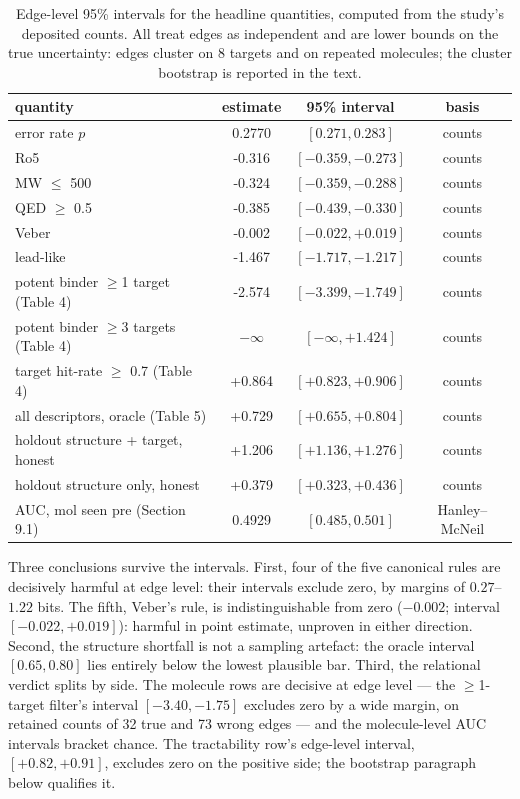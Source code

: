 \documentclass[11pt]{article}
\begin{document}
\begin{table}[t]
\centering
\caption{Edge-level 95\% intervals for the headline quantities, computed
from the study's deposited counts. All treat edges as independent and
are lower bounds on the true uncertainty: edges cluster on 8 targets and
on repeated molecules; the cluster bootstrap is reported in the text.}
\begin{tabular}{lccc}
\toprule
quantity & estimate & 95\% interval & basis \\
\midrule
error rate $p$ & 0.2770 & $[0.271, 0.283]$ & counts \\
Ro5 & -0.316 & $[-0.359, -0.273]$ & counts \\
MW $\leq$ 500 & -0.324 & $[-0.359, -0.288]$ & counts \\
QED $\geq$ 0.5 & -0.385 & $[-0.439, -0.330]$ & counts \\
Veber & -0.002 & $[-0.022, +0.019]$ & counts \\
lead-like & -1.467 & $[-1.717, -1.217]$ & counts \\
potent binder $\geq$1 target (Table 4) & -2.574 & $[-3.399, -1.749]$ & counts \\
potent binder $\geq$3 targets (Table 4) & $-\infty$ & $[-\infty, +1.424]$ & counts \\
target hit-rate $\geq$ 0.7 (Table 4) & +0.864 & $[+0.823, +0.906]$ & counts \\
all descriptors, oracle (Table 5) & +0.729 & $[+0.655, +0.804]$ & counts \\
holdout structure + target, honest & +1.206 & $[+1.136, +1.276]$ & counts \\
holdout structure only, honest & +0.379 & $[+0.323, +0.436]$ & counts \\
AUC, mol seen pre (Section 9.1) & 0.4929 & $[0.485, 0.501]$ & Hanley--McNeil \\
\bottomrule
\end{tabular}
\end{table}

Three conclusions survive the intervals. First, four of the five
canonical rules are decisively harmful at edge level: their intervals
exclude zero, by margins of $0.27$--$1.22$ bits. The fifth, Veber's
rule, is indistinguishable from zero ($-0.002$; interval
$[-0.022, +0.019]$): harmful in point estimate, unproven in either
direction. Second, the structure shortfall is not a sampling artefact:
the oracle interval $[0.65, 0.80]$ lies entirely below
the lowest plausible bar. Third, the relational verdict splits by side.
The molecule rows are decisive at edge level --- the $\geq$1-target
filter's interval $[-3.40, -1.75]$ excludes zero by a wide
margin, on retained counts of 32 true and 73 wrong edges --- and
the molecule-level AUC intervals bracket chance. The tractability
row's edge-level interval, $[+0.82, +0.91]$, excludes zero on
the positive side; the bootstrap paragraph below qualifies it.
\end{document}

